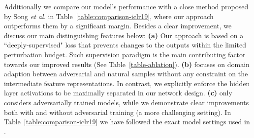 \documentclass[10pt,twocolumn,letterpaper]{article}
\begin{document}
Additionally we compare our model's performance with a close method proposed by Song \textit{et al.} \cite{song2018improving} in Table~\ref{table:comparison-iclr19}, where our approach outperforms them by a significant margin. Besides a clear improvement, we discuss our main distinguishing features below: \textbf{(a)} Our approach is based on a ``deeply-supervised" loss that prevents changes to the outputs within the limited perturbation budget. Such supervision paradigm is the main contributing factor towards our improved results (See Table~\ref{table-ablation}). \textbf{(b)} \cite{song2018improving} focuses on domain adaption between adversarial and natural samples without any constraint on the intermediate feature representations. In contrast, we explicitly enforce the hidden layer activations to be maximally separated in our network design. \textbf{(c)} \cite{song2018improving} only considers adversarially trained models, while we demonstrate clear improvements both with and without adversarial training (a more challenging setting). In Table~\ref{table:comparison-iclr19} we have followed the exact model settings used in \cite{song2018improving}.
\end{document}
